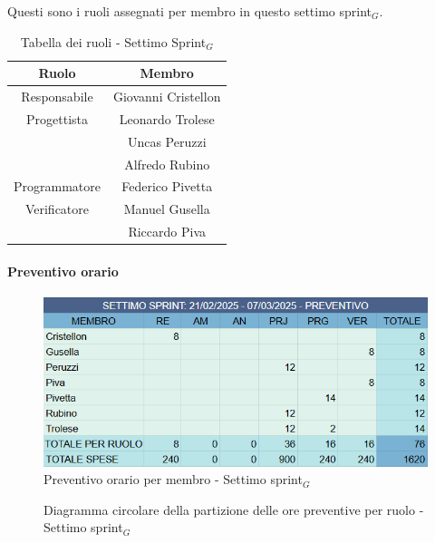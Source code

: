 \documentclass[10pt]{article}
\begin{document}
{{{{{{{{        Questi sono i ruoli assegnati per membro in questo settimo sprint$_G$.\\
        \begin{table}[H]
            \centering
            \begin{tabular}{|c|c|}
            \hline
            \rowcolor{gray!25}
            \textbf{Ruolo} & \textbf{Membro}\\
            \hline
            Responsabile & Giovanni Cristellon \\
            \hline
            Progettista & Leonardo Trolese \\
            & Uncas Peruzzi\\
            & Alfredo Rubino\\
            \hline
            Programmatore & Federico Pivetta\\
            \hline
            Verificatore & Manuel Gusella \\
            & Riccardo Piva\\
            \hline
            \end{tabular}
            \caption{Tabella dei ruoli - Settimo Sprint$_G$}
        \end{table}

        \paragraph{Preventivo orario}\mbox{}\vspace{0.4em}
        \begin{figure}[H]
            \centering
            \includegraphics[width=0.6\linewidth]{preventivoOreSettimoSprint.png}
            \caption{Preventivo orario per membro - Settimo sprint$_G$}
            \label{fig:Preventivo orario per membro - Settimo sprint$_G$}
        \end{figure}

        \begin{figure}[H]
            \centering
            \caption{Diagramma circolare della partizione delle ore preventive per ruolo - Settimo sprint$_G$ }
            \label{fig:Diagramma circolare della partizione delle ore preventive per ruolo - Settimo sprint$_G$}
        \end{figure}
        
}}}}}}}}
\end{document}
